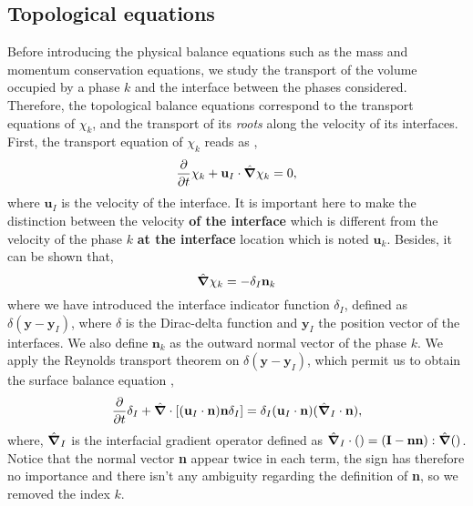 \subsection{Topological equations}

Before introducing the physical balance equations such as the mass and momentum conservation equations, we study the transport of the volume occupied by a phase $k$ and the interface between the phases considered. 
Therefore, the topological balance equations correspond to the transport equations of $\chi_k$, and the transport of its \textit{roots} along the velocity of its interfaces. 
First, the transport equation of $\chi_k$ reads as \citep{drew1983mathematical,kataoka1986local,morel2015mathematical},
\begin{equation}
    \frac{\partial}{\partial t} \chi_k
    + \textbf{u}_I \cdot \hat{\bm{\nabla}} \chi_k 
    = 0,
    \label{eq:phaseindicator_transport}
\end{equation}
where $\textbf{u}_I$ is the velocity of the interface.
It is important here to make the distinction between the velocity \textbf{of the interface} which is different from the velocity of the phase $k$ \textbf{at the interface} location which is noted $\textbf{u}_k$.
Besides, it can be shown \citep{tryggvason2011direct} that, 
\begin{equation}
    \hat{\bm{\nabla}} \chi_k 
    = - \delta_I \textbf{n}_k   
\end{equation}
where we have introduced the interface indicator function $\delta_I$, defined as $\delta(\textbf{y}-\textbf{y}_I)$, where $\delta$ is the Dirac-delta function and $\textbf{y}_I$ the position vector of the interfaces. 
We also define $\textbf{n}_k$ as the outward normal vector of the phase $k$. 
We apply the Reynolds transport theorem on $\delta(\textbf{y}-\textbf{y}_I)$, which permit us to obtain the surface balance equation \citep{lhuillier2003dynamics,morel2015mathematical}, 
\begin{equation}
    \frac{\partial}{\partial t} \delta_I
    + \hat{\bm{\nabla}} \cdot\left[
        (\textbf{u}_I\cdot\textbf{n})\textbf{n}\delta_I 
    \right]
    = \delta_I (\textbf{u}_I\cdot\textbf{n})
    (\hat{\bm{\nabla}}_I\cdot\textbf{n}),
    \label{eq:interface_transport}
\end{equation}
where, $\hat{\bm{\nabla}}_I$ is the interfacial gradient operator defined as $\hat{\bm{\nabla}}_I\cdot() = (\textbf{I}-\textbf{nn}):\hat{\bm{\nabla}}()$.
Notice that the normal vector \textbf{n} appear twice in each term, the sign has therefore no importance and there isn't any ambiguity regarding the definition of \textbf{n}, so we removed the index $k$.  
